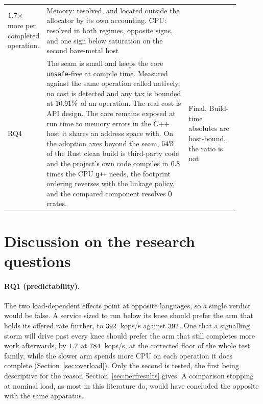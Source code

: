 \documentclass[english,oneside,a4paper,censored,csm,software-track-2020]{HYthesisML}
\begin{document}
\begin{table}[tp]
\begin{tabular}{@{}p{0.06\linewidth} p{0.62\linewidth} p{0.22\linewidth}@{}}
$1.7\times$ more per completed operation. & Memory: resolved, and located
outside the allocator by its own accounting. CPU: resolved in both regimes, opposite signs, and
one sign below saturation on the second bare-metal host \\
RQ4 & The seam is small and keeps the core \texttt{unsafe}-free at compile time. Measured against
the same operation called natively, no cost is detected and any tax is bounded at
$10.91\%$ of an operation. The real cost is API design. The core remains exposed at run
time to memory errors in the C++ host it shares an address space with. On the adoption axes beyond
the seam, $54\%$ of the Rust clean build is third-party code and the project's own
code compiles in $0.8$ times the CPU \texttt{g++} needs, the footprint
ordering reverses with the linkage policy, and the compared component resolves $0$ crates.
& Final. Build-time absolutes are host-bound, the ratio is not \\
\hline
\end{tabular}
\end{table}

\section{Discussion on the research questions}\label{sec:rqdiscussion}
\paragraph{RQ1 (predictability).} The two load-dependent effects point at opposite languages, so a
single verdict would be false. A service sized to run below its knee should prefer the arm that
holds its offered rate further, to $392$~kops/s against $392$. One that
a signalling storm will drive past every knee should prefer the arm that still completes more work
afterwards, by $1.7$ at $784$~kops/s, at the corrected floor of the whole
test family, while the slower arm spends more CPU on each operation it does complete
(Section~\ref{sec:overload}). Only the second is tested, the first being descriptive for the
reason Section~\ref{sec:perfresults} gives. A comparison stopping at nominal load, as most in this
literature do, would have concluded the opposite with the same apparatus.
\end{document}
